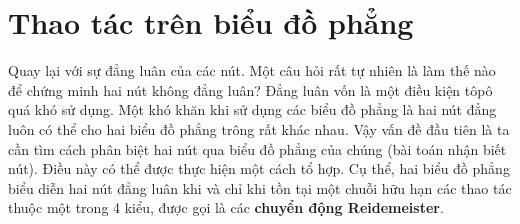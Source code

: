 \documentclass[12pt]{article}
\begin{document}
\section{Thao tác trên biểu đồ phẳng}

Quay lại với sự đẳng luân của các nút. Một câu hỏi rất tự nhiên là làm thế nào để chứng minh hai nút không đẳng luân? Đẳng luân vốn là một điều kiện tôpô quá khó sử dụng. Một khó khăn khi sử dụng các biểu đồ phẳng là hai nút đẳng luôn có thể cho hai biểu đồ phẳng trông rất khác nhau. Vậy vấn đề đầu tiên là ta cần tìm cách phân biệt hai nút qua biểu đồ phẳng của chúng (bài toán nhận biết nút). Điều này có thể được thực hiện một cách tổ hợp. Cụ thể, hai biểu đồ phẳng biểu diễn hai nút đẳng luân khi và chỉ khi tồn tại một chuỗi hữu hạn các thao tác thuộc một trong 4 kiểu, được gọi là các {\bf chuyển động Reidemeister}.
\end{document}
